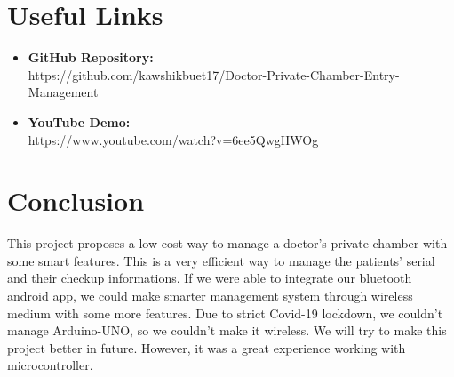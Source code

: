\documentclass[a4paper,12pt]{article}
\begin{document}
	\section{Useful Links}
	\begin{itemize}
	    \item \textbf{GitHub Repository:}\\ https://github.com/kawshikbuet17/Doctor-Private-Chamber-Entry-Management
	    \item \textbf{YouTube Demo:}\\ https://www.youtube.com/watch?v=6ee5QwgHWOg
	\end{itemize}
	
	\section{Conclusion}
	This project proposes a low cost way to manage a doctor's private chamber with some smart features. This is a very efficient way to manage the patients' serial and their checkup informations. If we were able to integrate our bluetooth android app, we could make smarter management system through wireless medium with some more features. Due to strict Covid-19 lockdown, we couldn't manage Arduino-UNO, so we couldn't make it wireless. We will try to make this project better in future. However, it was a great experience working with microcontroller. 
\end{document}
